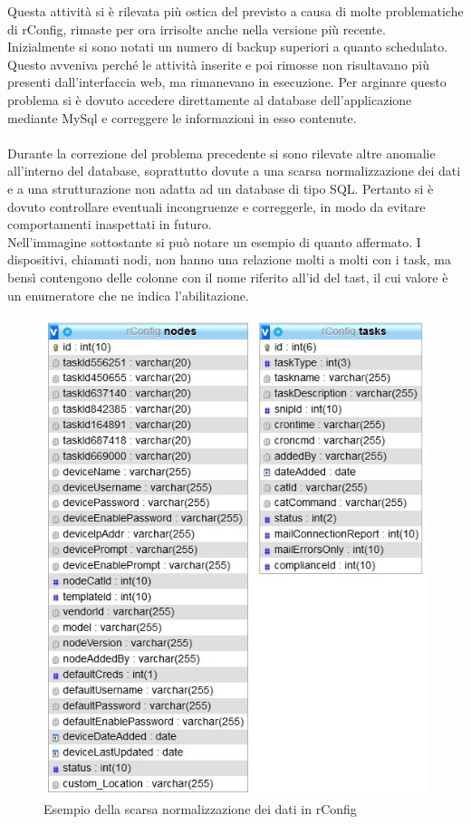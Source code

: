 \documentclass[Realizzazione.tex]{subfiles}
\begin{document}
Questa attività si è rilevata più ostica del previsto a causa di molte problematiche di rConfig, rimaste per ora irrisolte anche nella versione più recente. \\
Inizialmente si sono notati un numero di backup superiori a quanto schedulato. Questo avveniva perché le attività inserite e poi rimosse non risultavano più presenti dall'interfaccia web, ma rimanevano in esecuzione. Per arginare questo problema si è dovuto accedere direttamente al database dell'applicazione mediante MySql e correggere le informazioni in esso contenute. \\\\
Durante la correzione del problema precedente si sono rilevate altre anomalie all'interno del database, soprattutto dovute a una scarsa normalizzazione dei dati e a una strutturazione non adatta ad un database di tipo SQL. Pertanto si è dovuto controllare eventuali incongruenze e correggerle, in modo da evitare comportamenti inaspettati in futuro. \\
Nell'immagine sottostante si può notare un esempio di quanto affermato. I dispositivi, chiamati nodi, non hanno una relazione molti a molti con i task, ma bensì contengono delle colonne con il nome riferito all'id del tast, il cui valore è un enumeratore che ne indica l'abilitazione.
\begin{figure}[H]
	\centering
	\includegraphics[width=0.6\linewidth]{"images/rconfig_normalizzazione"}
	\caption{Esempio della scarsa normalizzazione dei dati in rConfig}
	\label{fig:Esempio della scarsa normalizzazione dei dati in rConfig}
\end{figure}
\end{document}
